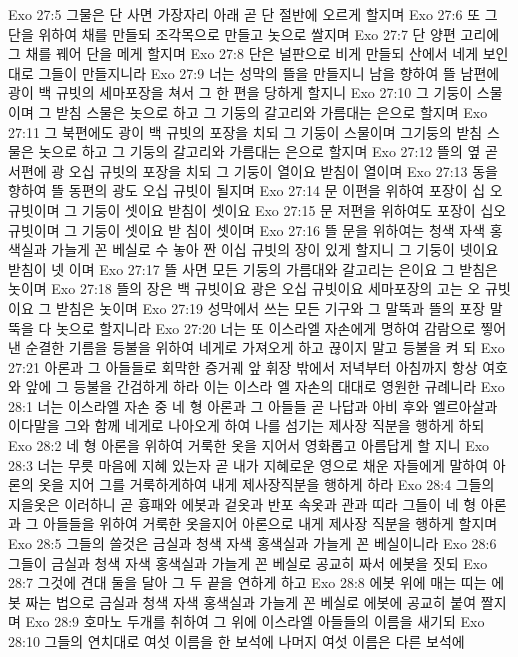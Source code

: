 Exo 27:5  그물은 단 사면 가장자리 아래 곧 단 절반에 오르게 할지며
Exo 27:6  또 그 단을 위하여 채를 만들되 조각목으로 만들고 놋으로 쌀지며
Exo 27:7  단 양편 고리에 그 채를 꿰어 단을 메게 할지며
Exo 27:8  단은 널판으로 비게 만들되 산에서 네게 보인대로 그들이 만들지니라
Exo 27:9  너는 성막의 뜰을 만들지니 남을 향하여 뜰 남편에 광이 백 규빗의 세마포장을 쳐서 그 한 편을 당하게 할지니
Exo 27:10  그 기둥이 스물이며 그 받침 스물은 놋으로 하고 그 기둥의 갈고리와 가름대는 은으로 할지며
Exo 27:11  그 북편에도 광이 백 규빗의 포장을 치되 그 기둥이 스물이며 그기둥의 받침 스물은 놋으로 하고 그 기둥의 갈고리와 가름대는 은으로 할지며
Exo 27:12  뜰의 옆 곧 서편에 광 오십 규빗의 포장을 치되 그 기둥이 열이요 받침이 열이며
Exo 27:13  동을 향하여 뜰 동편의 광도 오십 규빗이 될지며
Exo 27:14  문 이편을 위하여 포장이 십 오 규빗이며 그 기둥이 셋이요 받침이 셋이요
Exo 27:15  문 저편을 위하여도 포장이 십오 규빗이며 그 기둥이 셋이요 받 침이 셋이며
Exo 27:16  뜰 문을 위하여는 청색 자색 홍색실과 가늘게 꼰 베실로 수 놓아 짠 이십 규빗의 장이 있게 할지니 그 기둥이 넷이요 받침이 넷 이며
Exo 27:17  뜰 사면 모든 기둥의 가름대와 갈고리는 은이요 그 받침은 놋이며
Exo 27:18  뜰의 장은 백 규빗이요 광은 오십 규빗이요 세마포장의 고는 오 규빗이요 그 받침은 놋이며
Exo 27:19  성막에서 쓰는 모든 기구와 그 말뚝과 뜰의 포장 말뚝을 다 놋으로 할지니라
Exo 27:20  너는 또 이스라엘 자손에게 명하여 감람으로 찧어낸 순결한 기름을 등불을 위하여 네게로 가져오게 하고 끊이지 말고 등불을 켜 되
Exo 27:21  아론과 그 아들들로 회막한 증거궤 앞 휘장 밖에서 저녁부터 아침까지 항상 여호와 앞에 그 등불을 간검하게 하라 이는 이스라 엘 자손의 대대로 영원한 규례니라
Exo 28:1  너는 이스라엘 자손 중 네 형 아론과 그 아들들 곧 나답과 아비 후와 엘르아살과 이다말을 그와 함께 네게로 나아오게 하여 나를 섬기는 제사장 직분을 행하게 하되
Exo 28:2  네 형 아론을 위하여 거룩한 옷을 지어서 영화롭고 아름답게 할 지니
Exo 28:3  너는 무릇 마음에 지혜 있는자 곧 내가 지혜로운 영으로 채운 자들에게 말하여 아론의 옷을 지어 그를 거룩하게하여 내게 제사장직분을 행하게 하라
Exo 28:4  그들의 지을옷은 이러하니 곧 흉패와 에봇과 겉옷과 반포 속옷과 관과 띠라 그들이 네 형 아론과 그 아들들을 위하여 거룩한 옷을지어 아론으로 내게 제사장 직분을 행하게 할지며
Exo 28:5  그들의 쓸것은 금실과 청색 자색 홍색실과 가늘게 꼰 베실이니라
Exo 28:6  그들이 금실과 청색 자색 홍색실과 가늘게 꼰 베실로 공교히 짜서 에봇을 짓되
Exo 28:7  그것에 견대 둘을 달아 그 두 끝을 연하게 하고
Exo 28:8  에봇 위에 매는 띠는 에봇 짜는 법으로 금실과 청색 자색 홍색실과 가늘게 꼰 베실로 에봇에 공교히 붙여 짤지며
Exo 28:9  호마노 두개를 취하여 그 위에 이스라엘 아들들의 이름을 새기되
Exo 28:10  그들의 연치대로 여섯 이름을 한 보석에 나머지 여섯 이름은 다른 보석에
